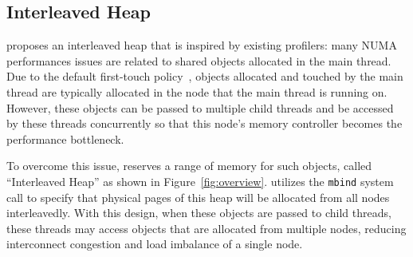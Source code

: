 \subsection{Interleaved Heap} 


\NA{} proposes an interleaved heap that is inspired by existing profilers\cite{XULIU, MemProf}: many NUMA performances issues are related to shared objects allocated in the main thread. Due to the default first-touch policy~\cite{lameter2013numa, diener2015locality}, objects allocated and touched by the main thread are typically allocated in the node that the main thread is running on. However, these objects can be passed to multiple child threads and be accessed by these threads concurrently so that this node's memory controller becomes the performance bottleneck. 

To overcome this issue, \NA{} reserves a range of memory for such objects, called ``Interleaved Heap'' as shown in Figure~\ref{fig:overview}. \NA{} utilizes the \texttt{mbind} system call to specify that physical pages of this heap will be allocated from all nodes interleavedly. With this design, when these objects are passed to child threads, these threads may access objects that are allocated from multiple nodes, reducing interconnect congestion and load imbalance of a single node. 

